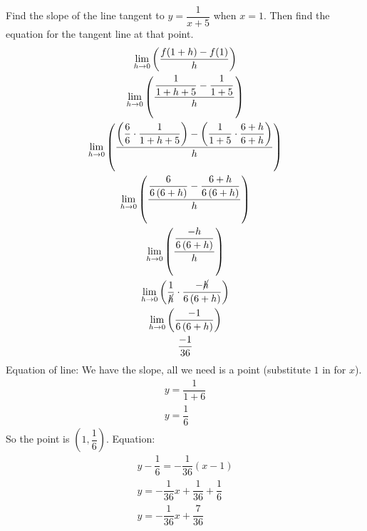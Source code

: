 \begin{example}
    Find the slope of the line tangent to $y = \dfrac{1}{x + 5}$ when $x = 1$. Then find the equation for the tangent line at that point.
    \begin{gather*}
        \lim_{h \to 0} \left(\dfrac{f(1 + h) - f(1)}{h}\right) \\
        \lim_{h \to 0} \left(\dfrac{\dfrac{1}{1 + h + 5} - \dfrac{1}{1 + 5}}{h}\right) \\
        \lim_{h \to 0} \left(\dfrac{\left(\dfrac{6}{6} \cdot \dfrac{1}{1 + h + 5}\right) - \left(\dfrac{1}{1 + 5} \cdot \dfrac{6 + h}{6 + h}\right)}{h}\right) \\
        \lim_{h \to 0} \left(\dfrac{\dfrac{6}{6\left(6 + h\right)} - \dfrac{6 + h}{6\left(6 + h\right)}}{h}\right) \\
        \lim_{h \to 0} \left(\dfrac{\dfrac{-h}{6\left(6 + h\right)}}{h}\right) \\
        \lim_{h \to 0} \left(\dfrac{1}{\cancel{h}} \cdot \dfrac{-\cancel{h}}{6\left(6 + h\right)}\right) \\
        \lim_{h \to 0} \left(\dfrac{-1}{6\left(6 + h\right)}\right) \\
        \dfrac{-1}{36}
    \end{gather*}
    Equation of line: We have the slope, all we need is a point (substitute $1$ in for $x$).
    \begin{gather*}
        y = \dfrac{1}{1 + 6}\\
        y = \dfrac{1}{6}
    \end{gather*}
    So the point is $(1, \dfrac{1}{6})$.
    Equation:
    \begin{gather*}
        y - \dfrac{1}{6} = -\dfrac{1}{36} \left(x - 1\right) \\
        y = -\dfrac{1}{36}x + \dfrac{1}{36} + \dfrac{1}{6} \\
        y = -\dfrac{1}{36}x + \dfrac{7}{36} \\
    \end{gather*}
\end{example}
